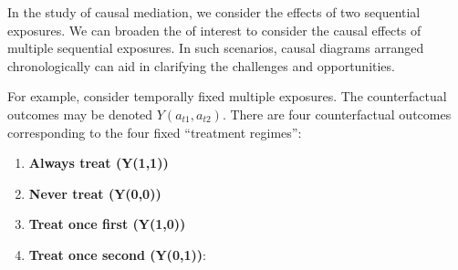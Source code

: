 \documentclass[
  singlecolumn]{report}
\begin{document}
In the study of causal mediation, we consider the effects of two
sequential exposures. We can broaden the of interest to consider the
causal effects of multiple sequential exposures. In such scenarios,
causal diagrams arranged chronologically can aid in clarifying the
challenges and opportunities.

For example, consider temporally fixed multiple exposures. The
counterfactual outcomes may be denoted \(Y(a_{t1} ,a_{t2})\). There are
four counterfactual outcomes corresponding to the four fixed ``treatment
regimes'':

\begin{enumerate}
\def\labelenumi{\arabic{enumi}.}
\item
  \textbf{Always treat (Y(1,1))}
\item
  \textbf{Never treat (Y(0,0))}
\item
  \textbf{Treat once first (Y(1,0))}
\item
  \textbf{Treat once second (Y(0,1))}:
\end{enumerate}
\end{document}
